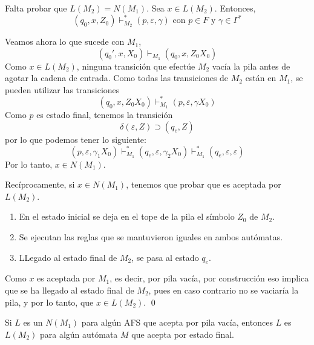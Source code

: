 \begin{Dem}
Falta probar que $L(M_2)=N(M_1)$. Sea $x\in L(M_2)$. Entonces,
$$ (q_0,x,Z_0)\vdash_{M_2}^* (p,\varepsilon, \gamma) \text{ con } p\in F \text{ y } \gamma \in \Gamma^*$$

Veamos ahora lo que sucede con $M_1$,
$$(q_0',x,X_0) \vdash_{M_1} (q_0,x,Z_0X_0)$$
Como $x\in L(M_2)$, ninguna transición que efectúe $M_2$ vacía la pila antes de agotar la cadena de entrada. Como todas las transiciones de $M_2$ están en $M_1$, se pueden utilizar las transiciones
$$ (q_0,x,Z_0X_0)\vdash^*_{M_1} (p,\varepsilon, \gamma X_0)$$
Como $p$ es estado final, tenemos la transición
$$\delta(\varepsilon,Z)\supset (q_e,Z)$$
por lo que podemos tener lo siguiente:
$$(p,\varepsilon, \gamma_1 X_0)\vdash_{M_1}^* (q_e,\varepsilon, \gamma_2 X_0)\vdash_{M_1}^* (q_e,\varepsilon, \varepsilon )$$
Por lo tanto, $x\in N(M_1)$. 

Recíprocamente, si $x\in N(M_1)$, tenemos que probar que es aceptada por $L(M_2)$. 
\begin{enumerate}
\item En el estado inicial se deja en el tope de la pila el símbolo $Z_0$ de $M_2$. 
\item Se ejecutan las reglas que se mantuvieron iguales en ambos autómatas.
\item LLegado al estado final de $M_2$, se pasa al estado $q_e$.
\end{enumerate}

Como $x$ es aceptada por $M_1$, es decir, por pila vacía, por construcción eso implica que se ha llegado al estado final de $M_2$, pues en caso contrario no se vaciaría la pila, y por lo tanto, que $x\in L(M_2)$. 
\qed

\end{Dem}

\begin{Teo}
Si $L$ es un $N(M_1)$ para algún AFS que acepta por pila vacía, entonces $L$ es $L(M_2)$ para algún autómata $M$ que acepta por estado final. 
\end{Teo}

